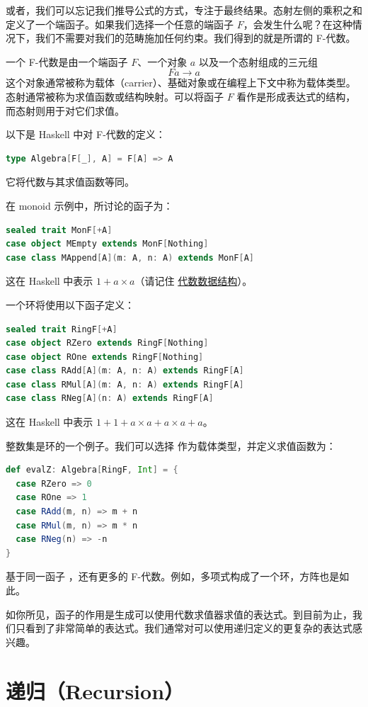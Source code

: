 或者，我们可以忘记我们推导公式的方式，专注于最终结果。态射左侧的乘积之和定义了一个端函子。如果我们选择一个任意的端函子 $F$，会发生什么呢？在这种情况下，我们不需要对我们的范畴施加任何约束。我们得到的就是所谓的 F-代数。

一个 F-代数是由一个端函子 $F$、一个对象 $a$ 以及一个态射组成的三元组
\[F a \to a\]
这个对象通常被称为载体（carrier）、基础对象或在编程上下文中称为载体类型。态射通常被称为求值函数或结构映射。可以将函子 $F$ 看作是形成表达式的结构，而态射则用于对它们求值。

以下是 Haskell 中对 F-代数的定义：

\begin{lstlisting}[language=Scala]
type Algebra[F[_], A] = F[A] => A
\end{lstlisting}
它将代数与其求值函数等同。

在 monoid 示例中，所讨论的函子为：

\begin{lstlisting}[language=Scala]
sealed trait MonF[+A]
case object MEmpty extends MonF[Nothing]
case class MAppend[A](m: A, n: A) extends MonF[A]
\end{lstlisting}
这在 Haskell 中表示 $1 + a\times{}a$（请记住 \hyperref[simple-algebraic-data-types]{代数数据结构}）。

一个环将使用以下函子定义：

\begin{lstlisting}[language=Scala]
sealed trait RingF[+A]
case object RZero extends RingF[Nothing]
case object ROne extends RingF[Nothing]
case class RAdd[A](m: A, n: A) extends RingF[A]
case class RMul[A](m: A, n: A) extends RingF[A]
case class RNeg[A](n: A) extends RingF[A]
\end{lstlisting}
这在 Haskell 中表示 $1 + 1 + a\times{}a + a\times{}a + a$。

整数集是环的一个例子。我们可以选择  作为载体类型，并定义求值函数为：

\begin{lstlisting}[language=Scala]
def evalZ: Algebra[RingF, Int] = {
  case RZero => 0
  case ROne => 1
  case RAdd(m, n) => m + n
  case RMul(m, n) => m * n
  case RNeg(n) => -n
}
\end{lstlisting}
基于同一函子 ，还有更多的 F-代数。例如，多项式构成了一个环，方阵也是如此。

如你所见，函子的作用是生成可以使用代数求值器求值的表达式。到目前为止，我们只看到了非常简单的表达式。我们通常对可以使用递归定义的更复杂的表达式感兴趣。

\section{递归（Recursion）}

